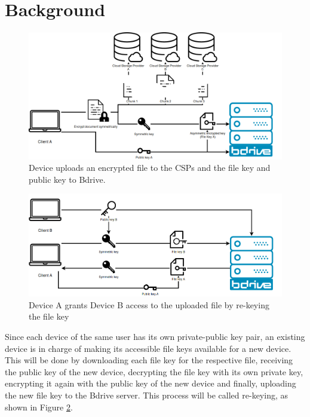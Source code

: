 \section{Background}
\label{sec:background}
\begin{figure}[!ht]
\centering
    \includegraphics[width=1\linewidth]{img/bdrive1.png}\par 
    \caption{Device uploads an encrypted file to the \ac{CSP}s and the file key and public key to Bdrive.}
    \label{fig:filekey}
\end{figure}
\begin{figure}[!ht]
\centering
    \includegraphics[width=1\linewidth]{img/bdrive2.png}\par
    \caption{Device A grants Device B access to the uploaded file by re-keying the file key}
    \label{fig:rekey}
\end{figure}
Since each device of the same user has its own private-public key pair, an existing device is in charge of making its accessible file keys available for a new device. This will be done by downloading each file key for the respective file, receiving the public key of the new device, decrypting the file key with its own private key, encrypting it again with the public key of the new device and finally, uploading the new file key to the Bdrive server. This process will be called re-keying, as shown in Figure \ref{fig:rekey}. 

